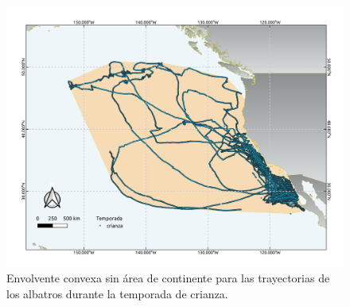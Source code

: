 \begin{figure}[h]
    \centering
    \includegraphics[scale=0.60]{figures/convexHullCrianza.png}
    \caption{Envolvente convexa sin área de continente para las trayectorias
    de los albatros durante la temporada de crianza.}
    \label{fig:convexHullCrianza}
\end{figure}

